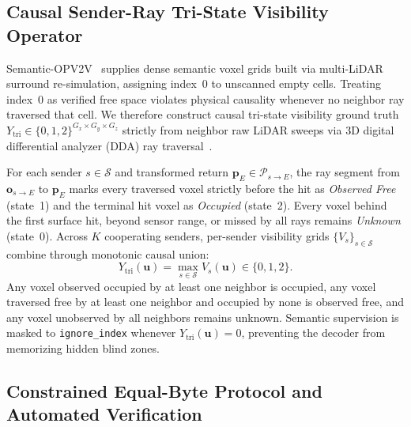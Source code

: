 \documentclass[journal]{IEEEtran}
\begin{document}
\subsection{Causal Sender-Ray Tri-State Visibility Operator}

Semantic-OPV2V~\cite{song2024cohff} supplies dense semantic voxel grids built via multi-LiDAR surround re-simulation, assigning index~0 to unscanned empty cells. Treating index~0 as verified free space violates physical causality whenever no neighbor ray traversed that cell. We therefore construct causal tri-state visibility ground truth $Y_{\mathrm{tri}} \in \{0, 1, 2\}^{G_x \times G_y \times G_z}$ strictly from neighbor raw LiDAR sweeps via 3D digital differential analyzer (DDA) ray traversal~\cite{amanatides1987ray,elfes1989occupancy,hornung2013octomap}.

For each sender $s \in \mathcal{S}$ and transformed return $\mathbf{p}_E \in \mathcal{P}_{s \to E}$, the ray segment from $\mathbf{o}_{s \to E}$ to $\mathbf{p}_E$ marks every traversed voxel strictly before the hit as \textit{Observed Free} (state~1) and the terminal hit voxel as \textit{Occupied} (state~2). Every voxel behind the first surface hit, beyond sensor range, or missed by all rays remains \textit{Unknown} (state~0). Across $K$ cooperating senders, per-sender visibility grids $\{V_s\}_{s \in \mathcal{S}}$ combine through monotonic causal union:
\begin{equation}
Y_{\mathrm{tri}}(\mathbf{u}) = \max_{s \in \mathcal{S}} V_s(\mathbf{u}) \in \{0, 1, 2\}.
\label{eq:tristate_union}
\end{equation}
Any voxel observed occupied by at least one neighbor is occupied, any voxel traversed free by at least one neighbor and occupied by none is observed free, and any voxel unobserved by all neighbors remains unknown. Semantic supervision is masked to \texttt{ignore\_index} whenever $Y_{\mathrm{tri}}(\mathbf{u}) = 0$, preventing the decoder from memorizing hidden blind zones.

\subsection{Constrained Equal-Byte Protocol and Automated Verification}
\end{document}
